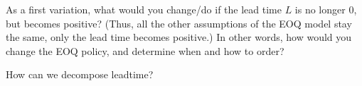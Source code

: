 \begin{exercise}
  As a first variation, what would you change/do if the lead time $L$
  is no longer 0, but becomes positive? (Thus, all the other
  assumptions of the EOQ model stay the same, only the lead time
  becomes positive.)  In other words, how would you change the EOQ
  policy, and determine when and how to order?

\end{exercise}

\begin{exercise}

How can we decompose leadtime?

\end{exercise}



